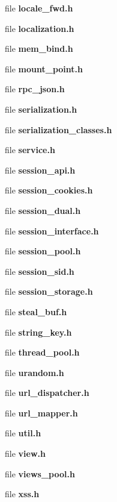 \begin{DoxyCompactItemize}
\item 
file {\bfseries locale\-\_\-fwd.\-h}
\item 
file {\bfseries localization.\-h}
\item 
file {\bfseries mem\-\_\-bind.\-h}
\item 
file {\bfseries mount\-\_\-point.\-h}
\item 
file {\bfseries rpc\-\_\-json.\-h}
\item 
file {\bfseries serialization.\-h}
\item 
file {\bfseries serialization\-\_\-classes.\-h}
\item 
file {\bfseries service.\-h}
\item 
file {\bfseries session\-\_\-api.\-h}
\item 
file {\bfseries session\-\_\-cookies.\-h}
\item 
file {\bfseries session\-\_\-dual.\-h}
\item 
file {\bfseries session\-\_\-interface.\-h}
\item 
file {\bfseries session\-\_\-pool.\-h}
\item 
file {\bfseries session\-\_\-sid.\-h}
\item 
file {\bfseries session\-\_\-storage.\-h}
\item 
file {\bfseries steal\-\_\-buf.\-h}
\item 
file {\bfseries string\-\_\-key.\-h}
\item 
file {\bfseries thread\-\_\-pool.\-h}
\item 
file {\bfseries urandom.\-h}
\item 
file {\bfseries url\-\_\-dispatcher.\-h}
\item 
file {\bfseries url\-\_\-mapper.\-h}
\item 
file {\bfseries util.\-h}
\item 
file {\bfseries view.\-h}
\item 
file {\bfseries views\-\_\-pool.\-h}
\item 
file {\bfseries xss.\-h}
\end{DoxyCompactItemize}
